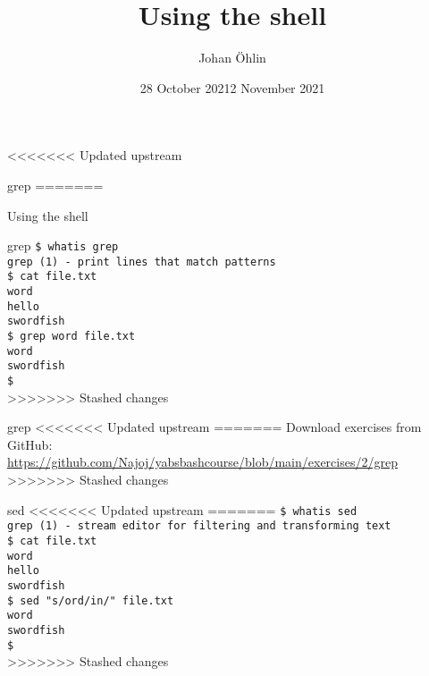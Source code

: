 \documentclass{beamer}
\title{Using the shell}
\date{28 October 2021}
\date{2 November 2021}
\author{Johan Öhlin}
\institute{Yabs}
\let\tt\texttt
\begin{document}
<<<<<<< Updated upstream
\maketitle

\begin{frame}{grep}
=======
\begin{frame}{Using the shell}
\maketitle
\end{frame}

\begin{frame}{grep}
        \tt{\$ whatis grep}\\
        \tt{grep (1)  - print lines that match patterns}\\
        \tt{\$ cat file.txt} \\
        \tt{word} \\
        \tt{hello} \\
        \tt{swordfish} \\
        \tt{\$ grep word file.txt} \\
        \tt{word} \\
        \tt{swordfish} \\
        \tt{\$ } \\
>>>>>>> Stashed changes
\end{frame}

\begin{frame}{grep}
<<<<<<< Updated upstream
=======
        Download exercises from GitHub: \\
        \url{https://github.com/Najoj/yabsbashcourse/blob/main/exercises/2/grep}
>>>>>>> Stashed changes
\end{frame}

\begin{frame}{sed}
<<<<<<< Updated upstream
=======
        \tt{\$ whatis sed}\\
        \tt{grep (1)  - stream editor for filtering and transforming text}\\
        \tt{\$ cat file.txt} \\
        \tt{word} \\
        \tt{hello} \\
        \tt{swordfish} \\
        \tt{\$ sed "s/ord/in/" file.txt} \\
        \tt{word} \\
        \tt{swordfish} \\
        \tt{\$ } \\
>>>>>>> Stashed changes
\end{frame}


\end{frame}
\end{document}

